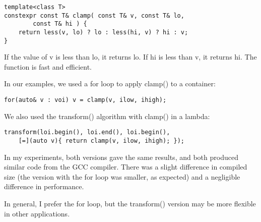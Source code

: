 \begin{lstlisting}[style=styleCXX]
template<class T>
constexpr const T& clamp( const T& v, const T& lo,
		const T& hi ) {
	return less(v, lo) ? lo : less(hi, v) ? hi : v;
}
\end{lstlisting}

If the value of v is less than lo, it returns lo. If hi is less than v, it returns hi.
The function is fast and efficient.

In our examples, we used a for loop to apply clamp() to a container:

\begin{lstlisting}[style=styleCXX]
for(auto& v : voi) v = clamp(v, ilow, ihigh);
\end{lstlisting}

We also used the transform() algorithm with clamp() in a lambda:

\begin{lstlisting}[style=styleCXX]
transform(loi.begin(), loi.end(), loi.begin(),
	[=](auto v){ return clamp(v, ilow, ihigh); });
\end{lstlisting}

In my experiments, both versions gave the same results, and both produced similar code from the GCC compiler. There was a slight difference in compiled size (the version with the for loop was smaller, as expected) and a negligible difference in performance.

In general, I prefer the for loop, but the transform() version may be more flexible in other applications.
